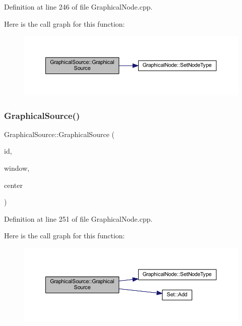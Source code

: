 Definition at line 246 of file Graphical\+Node.\+cpp.

Here is the call graph for this function\+:
\nopagebreak
\begin{figure}[H]
\begin{center}
\leavevmode
\includegraphics[width=350pt]{class_graphical_source_ad798712e86d821da957bbb7864d76c5a_cgraph}
\end{center}
\end{figure}
\mbox{\label{class_graphical_source_ad557a50f4519460a53e8f7b6f4b21f5b}} 
\subsubsection{\texorpdfstring{Graphical\+Source()}{GraphicalSource()}\hspace{0.1cm}{\footnotesize\ttfamily [2/2]}}
{\footnotesize\ttfamily Graphical\+Source\+::\+Graphical\+Source (\begin{DoxyParamCaption}\item[{\hyperlink{_graphical_element_8h_ade5fd6c85839a416577ff9de1605141e}{Element\+Key}}]{id,  }\item[{wx\+Window $\ast$}]{window,  }\item[{wx\+Point2\+D\+Double}]{center }\end{DoxyParamCaption})}



Definition at line 251 of file Graphical\+Node.\+cpp.

Here is the call graph for this function\+:
\nopagebreak
\begin{figure}[H]
\begin{center}
\leavevmode
\includegraphics[width=350pt]{class_graphical_source_ad557a50f4519460a53e8f7b6f4b21f5b_cgraph}
\end{center}
\end{figure}


